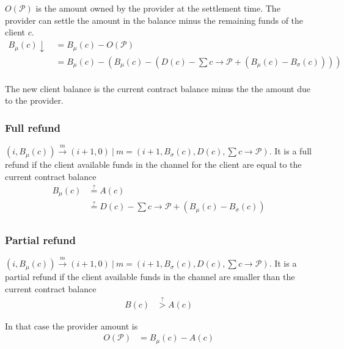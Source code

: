 \documentclass{llncs}
\begin{document}
$O(\mathcal{P})$ is the amount owned by the provider at the settlement time. The provider can settle the amount in the balance minus the remaining funds of the client $c$.
\begin{equation*}
\begin{split}
    B_\mu(c)\downarrow \ &= B_\mu(c) - O(\mathcal{P}) \\
    &= B_\mu(c) -(B_\mu(c) - (D(c) - \textstyle \sum c \rightarrow \mathcal{P} + (B_\mu(c) - B_\sigma(c)))) \\
\end{split}
\end{equation*}

The new client balance is the current contract balance minus the the amount due to the provider.

\subsubsection{Full refund} $(i, B_\mu(c)) \xrightarrow{m} (i+1, 0)\ |\ m = (i+1, B_\sigma(c), D(c), \sum c \rightarrow \mathcal{P})$. It is a full refund if the client available funds in the channel for the client are equal to the current contract balance
\begin{equation*}
\begin{split}
    B_\mu(c) &\overset{?}{=} A(c) \\
    &\overset{?}{=} D(c) - \textstyle \sum c \rightarrow \mathcal{P} + (B_\mu(c) - B_\sigma(c)) \\
\end{split}
\end{equation*}

\subsubsection{Partial refund} $(i, B_\mu(c)) \xrightarrow{m} (i+1, 0)\ |\ m = (i+1, B_\sigma(c), D(c), \sum c \rightarrow \mathcal{P})$. It is a partial refund if the client available funds in the channel are smaller than the current contract balance
\begin{equation*}
\begin{split}
    B(c) &\overset{?}{>} A(c)
\end{split}
\end{equation*}

In that case the provider amount is
\begin{equation*}
\begin{split}
    O(\mathcal{P}) &= B_\mu(c) - A(c)
\end{split}
\end{equation*}
\end{document}

